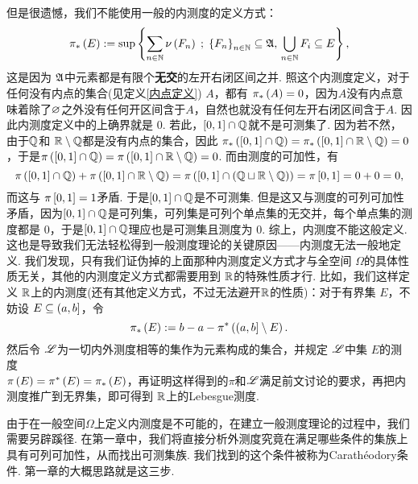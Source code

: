 \begin{enumerate}
    但是很遗憾，我们不能使用一般的内测度的定义方式：
    \[    \pi_*\left(E\right):=\sup \left\{ \sum_{n\in\mathbb{N}} \nu\left(F_n\right)\;;\;\left\{F_n\right\}_{n\in\mathbb{N}}\subseteq{\mathfrak{A}},\, \bigcup_{n\in\mathbb{N}}F_i\subseteq E \right\},   \]
    这是因为 ${\mathfrak{A}}$中元素都是有限个\textbf{无交}的左开右闭区间之并. 照这个内测度定义，对于任何没有内点的集合(见定义\ref{内点定义}) $A$，都有 $\pi_*\left(A\right)=0$，因为$A$没有内点意味着除了$\varnothing$之外没有任何开区间含于$A$，自然也就没有任何左开右闭区间含于$A$. 因此内测度定义中的上确界就是 $0$. 若此，$\left[0,1\right]\cap\mathbb{Q}$就不是可测集了. 因为若不然，由于$\mathbb{Q}$和 $\mathbb{R}\setminus\mathbb{Q}$都是没有内点的集合，因此 $\pi_*\left(\left[0,1\right]\cap\mathbb{Q}\right)=\pi_*\left(\left[0,1\right]\cap\mathbb{R}\setminus\mathbb{Q}\right)=0$，于是$\pi\left(\left[0,1\right]\cap\mathbb{Q}\right)=\pi\left(\left[0,1\right]\cap\mathbb{R}\setminus\mathbb{Q}\right)=0$. 而由测度的可加性，有
    \[   \pi\left(\left[0,1\right]\cap\mathbb{Q}\right)+\pi\left(\left[0,1\right]\cap\mathbb{R}\setminus\mathbb{Q}\right)=\pi\left(\left[0,1\right]\cap\left(\mathbb{Q}\sqcup\mathbb{R}\setminus\mathbb{Q}\right)\right)=\pi\left[0,1\right]=0+0=0,   \]
    而这与 $\pi\left[0,1\right]=1$矛盾. 于是$\left[0,1\right]\cap\mathbb{Q}$是不可测集. 但是这又与测度的可列可加性矛盾，因为$\left[0,1\right]\cap\mathbb{Q}$是可列集，可列集是可列个单点集的无交并，每个单点集的测度都是 $0$，于是$\left[0,1\right]\cap\mathbb{Q}$理应也是可测集且测度为 $0.$ 综上，内测度不能这般定义. 这也是导致我们无法轻松得到一般测度理论的关键原因——内测度无法一般地定义. 我们发现，只有我们证伪掉的上面那种内测度定义方式才与全空间 $\Omega$的具体性质无关，其他的内测度定义方式都需要用到 $\mathbb{R}$的特殊性质才行. 比如，我们这样定义 $\mathbb{R}$上的内测度(还有其他定义方式，不过无法避开$\mathbb{R}$的性质)：对于有界集 $E$，不妨设 $E\subseteq\left(a,b\right]$，令
    \[   \pi_*\left(E\right):= b-a-\pi^*\left(\left(a,b\right]\setminus E\right).   \]
    然后令 $\mathscr{L}$为一切内外测度相等的集作为元素构成的集合，并规定 $\mathscr{L}$中集 $E$的测度\\ $\pi\left(E\right)=\pi^*\left(E\right)=\pi_*\left(E\right)$，再证明这样得到的$\pi$和$\mathscr{L}$满足前文讨论的要求，再把内测度推广到无界集，即可得到 $\mathbb{R}$上的Lebesgue测度.
\end{enumerate}
\vspace{0.5cm}

由于在一般空间$\Omega$上定义内测度是不可能的，在建立一般测度理论的过程中，我们需要另辟蹊径. 在第一章中，我们将直接分析外测度究竟在满足哪些条件的集族上具有可列可加性，从而找出可测集族. 我们找到的这个条件被称为Carathéodory条件. 第一章的大概思路就是这三步.


